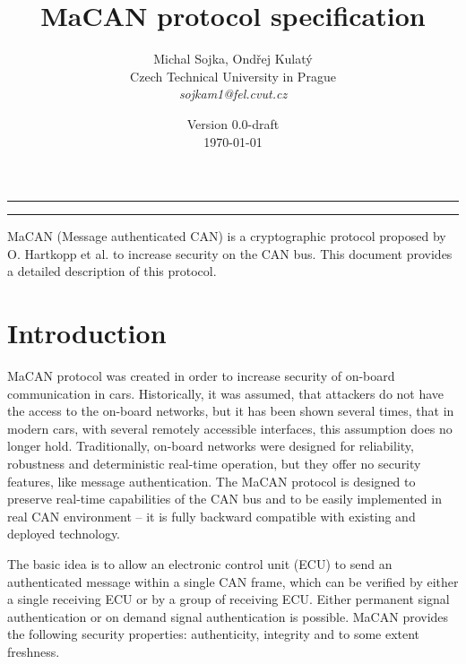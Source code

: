 \documentclass{article}
\title{MaCAN protocol specification}
\author{Michal Sojka, Ondřej Kulatý\\
  Czech Technical University in Prague\\
  \emph{sojkam1@fel.cvut.cz}
}
\date{Version 0.0-draft\\\medskip \today}
\begin{document}
\maketitle

\hrule
  \setlength\columnsep{40pt}
\begin{multicols}{2}

  \setcounter{tocdepth}{2}
  \setlength\parskip{0pt}
  \tableofcontents
  {
    \setcounter{tocdepth}{3}
    \newsavebox{\discard}
    \savebox{\discard}{\vbox{\tableofcontents}}
  }
\end{multicols}
\hrule
\vspace{1cm}



\noindent MaCAN (Message authenticated CAN) is a cryptographic protocol proposed by O. Hartkopp et al. \cite{hartkopp12} to increase security on the CAN bus. This document provides a detailed description of this protocol.

\section{Introduction}

MaCAN protocol was created in order to increase security of on-board communication in cars. Historically, it was assumed, that attackers do not have the access to the on-board networks, but it has been shown several times, that in modern cars, with several remotely accessible interfaces, this assumption does no longer hold. Traditionally, on-board networks were designed for reliability, robustness and deterministic real-time operation, but they offer no security features, like message authentication. The MaCAN protocol is designed to preserve real-time capabilities of the CAN bus and to be easily implemented in real CAN environment -- it is fully backward compatible with existing and deployed technology.

The basic idea is to allow an electronic control unit (ECU) to send an authenticated message within a single CAN frame, which can be verified by either a single receiving ECU or by a group of receiving ECU. Either permanent signal authentication or on demand signal authentication is possible. MaCAN provides the following security properties: authenticity, integrity and to some extent freshness.
\end{document}
